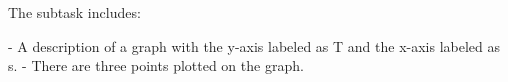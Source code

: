 The subtask includes:

- A description of a graph with the y-axis labeled as T and the x-axis labeled as s.
- There are three points plotted on the graph.